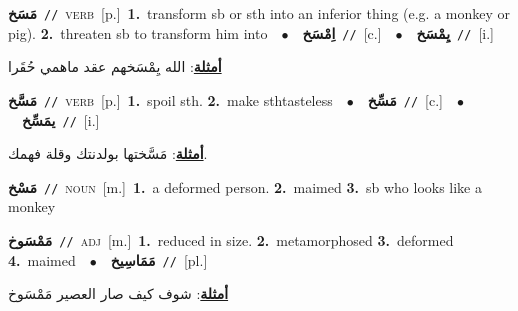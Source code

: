 \documentclass[10pt,a4paper,twoside]{article} %
\begin{document}
\begin{multicols}{2}
{\setlength\topsep{0pt}\textbf{\foreignlanguage{arabic}{مَسَخ}}\ {\color{gray}\texttt{//}\color{black}}\ \textsc{verb}\ [p.]\ \textbf{1.}~transform sb or sth into an inferior thing (e.g. a monkey or pig).  \textbf{2.}~threaten sb to transform him into\ \ $\bullet$\ \ \setlength\topsep{0pt}\textbf{\foreignlanguage{arabic}{اِمْسَخ}}\ {\color{gray}\texttt{//}\color{black}}\ [c.]\ \ $\bullet$\ \ \setlength\topsep{0pt}\textbf{\foreignlanguage{arabic}{يِمْسَخ}}\ {\color{gray}\texttt{//}\color{black}}\ [i.]\  \begin{flushright}\color{gray}\foreignlanguage{arabic}{\textbf{\underline{\foreignlanguage{arabic}{أمثلة}}}: الله يِمْسَخهم عقد ماهمي حُقَرا}\end{flushright}\color{black}} \vspace{2mm}

{\setlength\topsep{0pt}\textbf{\foreignlanguage{arabic}{مَسَّخ}}\ {\color{gray}\texttt{//}\color{black}}\ \textsc{verb}\ [p.]\ \textbf{1.}~spoil sth.  \textbf{2.}~make sthtasteless\ \ $\bullet$\ \ \setlength\topsep{0pt}\textbf{\foreignlanguage{arabic}{مَسِّخ}}\ {\color{gray}\texttt{//}\color{black}}\ [c.]\ \ $\bullet$\ \ \setlength\topsep{0pt}\textbf{\foreignlanguage{arabic}{يمَسِّخ}}\ {\color{gray}\texttt{//}\color{black}}\ [i.]\  \begin{flushright}\color{gray}\foreignlanguage{arabic}{\textbf{\underline{\foreignlanguage{arabic}{أمثلة}}}: مَسَّختها بولدنتك وقلة فهمك.}\end{flushright}\color{black}} \vspace{2mm}

{\setlength\topsep{0pt}\textbf{\foreignlanguage{arabic}{مَسْخ}}\ {\color{gray}\texttt{//}\color{black}}\ \textsc{noun}\ [m.]\ \textbf{1.}~a deformed person.  \textbf{2.}~maimed  \textbf{3.}~sb who looks like a monkey\ } \vspace{2mm}

{\setlength\topsep{0pt}\textbf{\foreignlanguage{arabic}{مَمْسَوخ}}\ {\color{gray}\texttt{//}\color{black}}\ \textsc{adj}\ [m.]\ \textbf{1.}~reduced in size.  \textbf{2.}~metamorphosed  \textbf{3.}~deformed  \textbf{4.}~maimed\ \ $\bullet$\ \ \setlength\topsep{0pt}\textbf{\foreignlanguage{arabic}{مَمَاسِيخ}}\ {\color{gray}\texttt{//}\color{black}}\ [pl.]\  \begin{flushright}\color{gray}\foreignlanguage{arabic}{\textbf{\underline{\foreignlanguage{arabic}{أمثلة}}}: شوف كيف صار العصير مَمْسَوخ}\end{flushright}\color{black}} \vspace{2mm}


\end{multicols}
\end{document}
